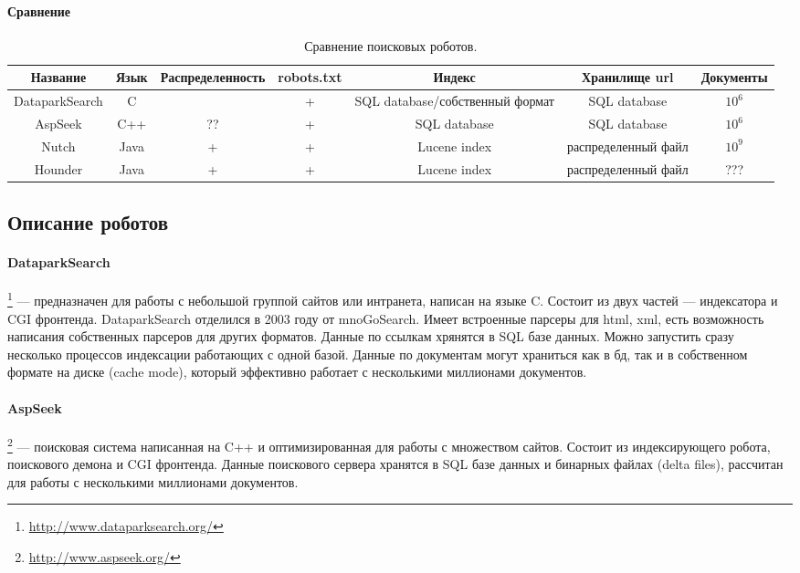 \paragraph{Сравнение}
\begin{table}[h]
\caption{\label{tab:crawlers}Сравнение поисковых роботов.}
\begin{center}
\begin{turn}{90}
\begin{tabular}{|c|c|c|c|c|c|c|}
\hline
Название & Язык & Распределенность & robots.txt & Индекс & Хранилище url & Документы\\
\hline
DataparkSearch & C & ~ & + & SQL database/собственный формат & SQL database & $10^{6}$\\
\hline
AspSeek & C++ & ?? & + & SQL database & SQL database & $10^{6}$\\
\hline
Nutch & Java & + & + & Lucene index & распределенный файл & $10^{9}$\\
\hline
Hounder & Java & + & + & Lucene index & распределенный файл & ???\\
\hline
\end{tabular}
\end{turn}
\end{center}
\end{table}


\subsection{Описание роботов}
\paragraph{DataparkSearch}\footnote{\href{http://www.dataparksearch.org/}{http://www.dataparksearch.org/}} --- предназначен для работы с небольшой группой сайтов или интранета, написан на языке C. Состоит из двух частей --- индексатора и CGI фронтенда. DataparkSearch отделился в 2003 году от mnoGoSearch. Имеет встроенные парсеры для html, xml, есть возможность написания собственных парсеров для других форматов. Данные по ссылкам хрянятся в SQL базе данных. Можно запустить сразу несколько процессов индексации работающих с одной базой. Данные по документам могут храниться как в бд, так и в собственном формате на диске (cache mode), который эффективно работает с несколькими миллионами документов.
\paragraph{AspSeek}\footnote{\href{http://www.aspseek.org/}{http://www.aspseek.org/}} --- поисковая система написанная на C++ и оптимизированная для работы с множеством сайтов. Состоит из индексирующего робота, поискового демона и CGI фронтенда. Данные поискового сервера хранятся в SQL базе данных и бинарных файлах (delta files), рассчитан для работы с несколькими миллионами документов.
